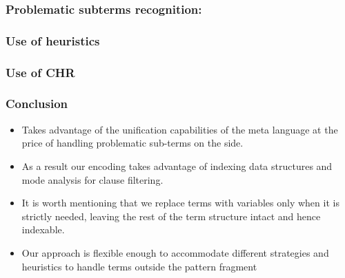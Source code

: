 \documentclass{pres}
\begin{document}
\begin{frame}
  \frametitle{Problematic subterms recognition: \maybelam}

  

\end{frame}

\begin{frame}
  \frametitle{Use of heuristics}

  

\end{frame}

\begin{frame}
  \frametitle{Use of CHR}



\end{frame}

\begin{frame}
  \frametitle{Conclusion}

  \begin{itemize}
    \item Takes advantage of the unification capabilities of the meta language
          at the price of handling problematic sub-terms on the side.
    \item As a result our encoding takes advantage of indexing data structures
          and mode analysis for clause filtering.
    \item It is worth mentioning that we replace terms with variables only when
          it is strictly needed, leaving the rest of the term structure intact
          and hence indexable.
    \item Our approach is flexible enough to accommodate different strategies
          and heuristics to handle terms outside the pattern fragment
  \end{itemize}

\end{frame}
\end{document}
